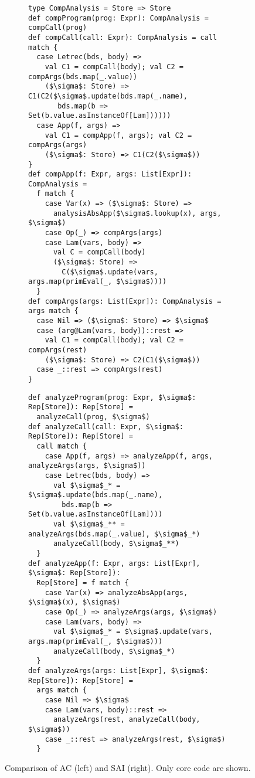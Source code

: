 \begin{figure*}
  \centering
  \begin{subfigure}[h]{0.49\textwidth}
    \centering
    \begin{lstlisting}
type CompAnalysis = Store => Store
def compProgram(prog: Expr): CompAnalysis = compCall(prog)
def compCall(call: Expr): CompAnalysis = call match {
  case Letrec(bds, body) =>
    val C1 = compCall(body); val C2 = compArgs(bds.map(_.value))
    ($\sigma$: Store) => C1(C2($\sigma$.update(bds.map(_.name), 
       bds.map(b => Set(b.value.asInstanceOf[Lam])))))
  case App(f, args) =>
    val C1 = compApp(f, args); val C2 = compArgs(args)
    ($\sigma$: Store) => C1(C2($\sigma$))
}
def compApp(f: Expr, args: List[Expr]): CompAnalysis = 
  f match {
    case Var(x) => ($\sigma$: Store) => 
      analysisAbsApp($\sigma$.lookup(x), args, $\sigma$)
    case Op(_) => compArgs(args)
    case Lam(vars, body) =>
      val C = compCall(body)
      ($\sigma$: Store) => 
        C($\sigma$.update(vars, args.map(primEval(_, $\sigma$))))
  }
def compArgs(args: List[Expr]): CompAnalysis = args match {
  case Nil => ($\sigma$: Store) => $\sigma$
  case (arg@Lam(vars, body))::rest =>
    val C1 = compCall(body); val C2 = compArgs(rest)
    ($\sigma$: Store) => C2(C1($\sigma$))
  case _::rest => compArgs(rest)
}
  \end{lstlisting}
  \end{subfigure}
\hfill
  \begin{subfigure}[h]{0.49\textwidth}
    \centering
    \begin{lstlisting}
def analyzeProgram(prog: Expr, $\sigma$: Rep[Store]): Rep[Store] = 
  analyzeCall(prog, $\sigma$)
def analyzeCall(call: Expr, $\sigma$: Rep[Store]): Rep[Store] = 
  call match {
    case App(f, args) => analyzeApp(f, args, analyzeArgs(args, $\sigma$))
    case Letrec(bds, body) =>
      val $\sigma$_* = $\sigma$.update(bds.map(_.name), 
        bds.map(b => Set(b.value.asInstanceOf[Lam])))
      val $\sigma$_** = analyzeArgs(bds.map(_.value), $\sigma$_*)
      analyzeCall(body, $\sigma$_**)
  }
def analyzeApp(f: Expr, args: List[Expr], $\sigma$: Rep[Store]): 
  Rep[Store] = f match {
    case Var(x) => analyzeAbsApp(args, $\sigma$(x), $\sigma$)
    case Op(_) => analyzeArgs(args, $\sigma$)
    case Lam(vars, body) =>
      val $\sigma$_* = $\sigma$.update(vars, args.map(primEval(_, $\sigma$)))
      analyzeCall(body, $\sigma$_*)
  }
def analyzeArgs(args: List[Expr], $\sigma$: Rep[Store]): Rep[Store] = 
  args match {
    case Nil => $\sigma$
    case Lam(vars, body)::rest => 
      analyzeArgs(rest, analyzeCall(body, $\sigma$))
    case _::rest => analyzeArgs(rest, $\sigma$)
  }
  \end{lstlisting}

  \end{subfigure}
  \caption{Comparison of AC (left) and SAI (right). Only core code are shown.}
  \label{compare_ac_sai}
\end{figure*}

